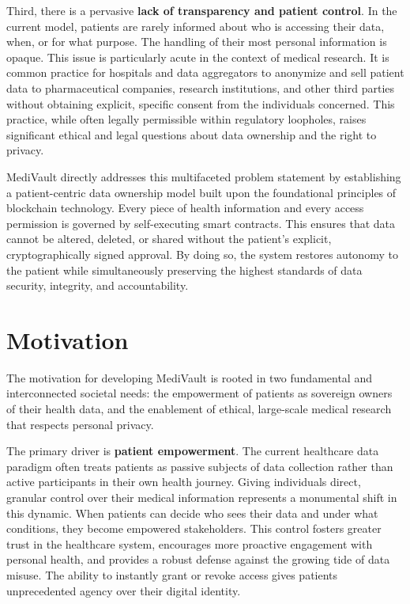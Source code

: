 Third, there is a pervasive \textbf{lack of transparency and patient control}. In the current model, patients are rarely informed about who is accessing their data, when, or for what purpose. The handling of their most personal information is opaque. This issue is particularly acute in the context of medical research. It is common practice for hospitals and data aggregators to anonymize and sell patient data to pharmaceutical companies, research institutions, and other third parties without obtaining explicit, specific consent from the individuals concerned. This practice, while often legally permissible within regulatory loopholes, raises significant ethical and legal questions about data ownership and the right to privacy.

MediVault directly addresses this multifaceted problem statement by establishing a patient-centric data ownership model built upon the foundational principles of blockchain technology. Every piece of health information and every access permission is governed by self-executing smart contracts. This ensures that data cannot be altered, deleted, or shared without the patient's explicit, cryptographically signed approval. By doing so, the system restores autonomy to the patient while simultaneously preserving the highest standards of data security, integrity, and accountability.

\section{Motivation}
The motivation for developing MediVault is rooted in two fundamental and interconnected societal needs: the empowerment of patients as sovereign owners of their health data, and the enablement of ethical, large-scale medical research that respects personal privacy.

The primary driver is \textbf{patient empowerment}. The current healthcare data paradigm often treats patients as passive subjects of data collection rather than active participants in their own health journey. Giving individuals direct, granular control over their medical information represents a monumental shift in this dynamic. When patients can decide who sees their data and under what conditions, they become empowered stakeholders. This control fosters greater trust in the healthcare system, encourages more proactive engagement with personal health, and provides a robust defense against the growing tide of data misuse. The ability to instantly grant or revoke access gives patients unprecedented agency over their digital identity.

